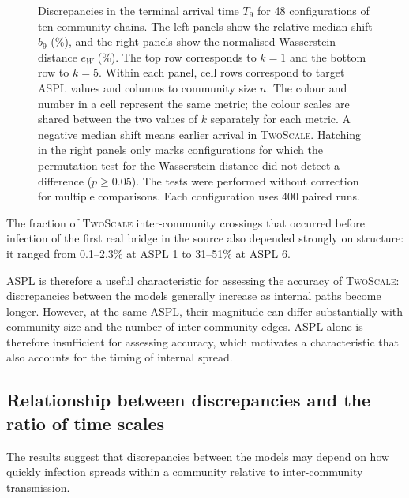 \documentclass[a4paper,fleqn]{cas-sc}
\newcommand{\TS}{\textup{\textsc{TwoScale}}}
\newcommand{\eW}{e_{W}}
\begin{document}
\begin{figure}[tbp]
\caption{%
Discrepancies in the terminal arrival time $T_9$ for 48 configurations of ten-community chains.
The left panels show the relative median shift $b_9$ (\%), and the right panels show the normalised Wasserstein distance $\eW$ (\%). The top row corresponds to $k=1$ and the bottom row to $k=5$.
Within each panel, cell rows correspond to target ASPL values and columns to community size $n$.
The colour and number in a cell represent the same metric; the colour scales are shared between the two values of $k$ separately for each metric.
A negative median shift means earlier arrival in \TS{}.
Hatching in the right panels only marks configurations for which the permutation test for the Wasserstein distance did not detect a difference ($p\geq0.05$).
The tests were performed without correction for multiple comparisons.
Each configuration uses 400 paired runs.
}
\label{fig:accuracy_map}
\end{figure}

The fraction of \TS{} inter-community crossings that occurred before infection of the first real bridge in the source also depended strongly on structure: it ranged from 0.1--2.3\% at ASPL 1 to 31--51\% at ASPL 6.

ASPL is therefore a useful characteristic for assessing the accuracy of \TS{}: discrepancies between the models generally increase as internal paths become longer. However, at the same ASPL, their magnitude can differ substantially with community size and the number of inter-community edges. ASPL alone is therefore insufficient for assessing accuracy, which motivates a characteristic that also accounts for the timing of internal spread.


\subsection{Relationship between discrepancies and the ratio of time scales}
\label{sec:res_descriptor}

The results suggest that discrepancies between the models may depend on how quickly infection spreads within a community relative to inter-community transmission.
\end{document}
